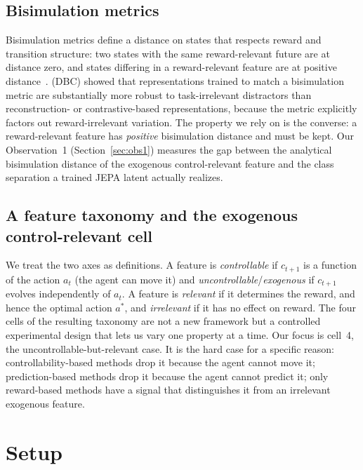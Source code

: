 \documentclass[11pt]{article}
\begin{document}
\subsection{Bisimulation metrics}
Bisimulation metrics define a distance on states that respects reward and transition structure:
two states with the same reward-relevant future are at distance zero, and states differing in a
reward-relevant feature are at positive distance~\citep{ferns2004metrics}. \citet{zhang2020dbc}
(DBC) showed that representations trained to match a bisimulation metric are substantially more
robust to task-irrelevant distractors than reconstruction- or contrastive-based representations,
because the metric explicitly factors out reward-irrelevant variation. The property we rely on is
the converse: a reward-relevant feature has \emph{positive} bisimulation distance and must be kept.
Our Observation~1 (Section~\ref{sec:obs1}) measures the gap between the analytical bisimulation
distance of the exogenous control-relevant feature and the class separation a trained JEPA latent
actually realizes.

\subsection{A feature taxonomy and the exogenous control-relevant cell}
\label{sec:taxonomy}
We treat the two axes as definitions. A feature is \emph{controllable} if $c_{t+1}$ is a function
of the action $a_t$ (the agent can move it) and \emph{uncontrollable}/\emph{exogenous} if $c_{t+1}$
evolves independently of $a_t$. A feature is \emph{relevant} if it determines the reward, and hence
the optimal action $a^\ast$, and \emph{irrelevant} if it has no effect on reward. The four cells of
the resulting taxonomy are not a new framework but a controlled experimental design that lets us
vary one property at a time. Our focus is cell~4, the uncontrollable-but-relevant case. It is the
hard case for a specific reason: controllability-based methods drop it because the agent cannot
move it; prediction-based methods drop it because the agent cannot predict it; only reward-based
methods have a signal that distinguishes it from an irrelevant exogenous feature.

\section{Setup}
\label{sec:setup}
\end{document}
